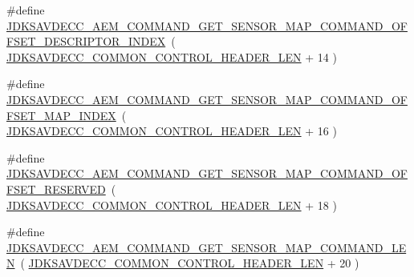 \begin{DoxyCompactItemize}
\#define \hyperlink{group__command__get__sensor__map_ga78de6211e7c335ff3098475c8da1d037}{J\+D\+K\+S\+A\+V\+D\+E\+C\+C\+\_\+\+A\+E\+M\+\_\+\+C\+O\+M\+M\+A\+N\+D\+\_\+\+G\+E\+T\+\_\+\+S\+E\+N\+S\+O\+R\+\_\+\+M\+A\+P\+\_\+\+C\+O\+M\+M\+A\+N\+D\+\_\+\+O\+F\+F\+S\+E\+T\+\_\+\+D\+E\+S\+C\+R\+I\+P\+T\+O\+R\+\_\+\+I\+N\+D\+EX}~( \hyperlink{group__jdksavdecc__avtp__common__control__header_gaae84052886fb1bb42f3bc5f85b741dff}{J\+D\+K\+S\+A\+V\+D\+E\+C\+C\+\_\+\+C\+O\+M\+M\+O\+N\+\_\+\+C\+O\+N\+T\+R\+O\+L\+\_\+\+H\+E\+A\+D\+E\+R\+\_\+\+L\+EN} + 14 )
\item 
\#define \hyperlink{group__command__get__sensor__map_ga38cc12e5c3133e32c136b87cad40eab5}{J\+D\+K\+S\+A\+V\+D\+E\+C\+C\+\_\+\+A\+E\+M\+\_\+\+C\+O\+M\+M\+A\+N\+D\+\_\+\+G\+E\+T\+\_\+\+S\+E\+N\+S\+O\+R\+\_\+\+M\+A\+P\+\_\+\+C\+O\+M\+M\+A\+N\+D\+\_\+\+O\+F\+F\+S\+E\+T\+\_\+\+M\+A\+P\+\_\+\+I\+N\+D\+EX}~( \hyperlink{group__jdksavdecc__avtp__common__control__header_gaae84052886fb1bb42f3bc5f85b741dff}{J\+D\+K\+S\+A\+V\+D\+E\+C\+C\+\_\+\+C\+O\+M\+M\+O\+N\+\_\+\+C\+O\+N\+T\+R\+O\+L\+\_\+\+H\+E\+A\+D\+E\+R\+\_\+\+L\+EN} + 16 )
\item 
\#define \hyperlink{group__command__get__sensor__map_ga46b788ba99f328f01ba8b81fa9dbbc82}{J\+D\+K\+S\+A\+V\+D\+E\+C\+C\+\_\+\+A\+E\+M\+\_\+\+C\+O\+M\+M\+A\+N\+D\+\_\+\+G\+E\+T\+\_\+\+S\+E\+N\+S\+O\+R\+\_\+\+M\+A\+P\+\_\+\+C\+O\+M\+M\+A\+N\+D\+\_\+\+O\+F\+F\+S\+E\+T\+\_\+\+R\+E\+S\+E\+R\+V\+ED}~( \hyperlink{group__jdksavdecc__avtp__common__control__header_gaae84052886fb1bb42f3bc5f85b741dff}{J\+D\+K\+S\+A\+V\+D\+E\+C\+C\+\_\+\+C\+O\+M\+M\+O\+N\+\_\+\+C\+O\+N\+T\+R\+O\+L\+\_\+\+H\+E\+A\+D\+E\+R\+\_\+\+L\+EN} + 18 )
\item 
\#define \hyperlink{group__command__get__sensor__map_ga0b827ef9dadd40f253eeddf4e8a89d44}{J\+D\+K\+S\+A\+V\+D\+E\+C\+C\+\_\+\+A\+E\+M\+\_\+\+C\+O\+M\+M\+A\+N\+D\+\_\+\+G\+E\+T\+\_\+\+S\+E\+N\+S\+O\+R\+\_\+\+M\+A\+P\+\_\+\+C\+O\+M\+M\+A\+N\+D\+\_\+\+L\+EN}~( \hyperlink{group__jdksavdecc__avtp__common__control__header_gaae84052886fb1bb42f3bc5f85b741dff}{J\+D\+K\+S\+A\+V\+D\+E\+C\+C\+\_\+\+C\+O\+M\+M\+O\+N\+\_\+\+C\+O\+N\+T\+R\+O\+L\+\_\+\+H\+E\+A\+D\+E\+R\+\_\+\+L\+EN} + 20 )
\end{DoxyCompactItemize}
